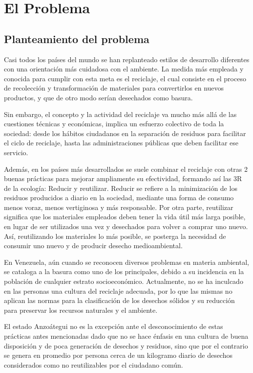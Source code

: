 \vspace*{6cm}
\chapter{El Problema}
\newpage

\section{Planteamiento del problema}

Casi todos los países del mundo se han replanteado estilos de desarrollo diferentes con una orientación más cuidadosa con el ambiente. La medida más empleada y conocida para cumplir con esta meta es el reciclaje, el cual consiste en el proceso de recolección y transformación de materiales para convertirlos en nuevos productos, y que de otro modo serían desechados como basura. 

Sin embargo, el concepto y la actividad del reciclaje va mucho más allá de las cuestiones técnicas y económicas, implica un esfuerzo colectivo de toda la sociedad: desde los hábitos ciudadanos en la separación de residuos para facilitar el ciclo de reciclaje, hasta las administraciones públicas que deben facilitar ese servicio. 

Además, en los países más desarrollados se suele combinar el reciclaje con otras 2 buenas prácticas para mejorar ampliamente su efectividad, formando así las 3R de la ecología: Reducir y reutilizar. Reducir se refiere a la minimización de los residuos producidos a diario en la sociedad, mediante una forma de consumo menos voraz, menos vertiginosa y más responsable. Por otra parte, reutilizar significa que los materiales empleados deben tener la vida útil más larga posible, en lugar de ser utilizados una vez y desechados para volver a comprar uno nuevo. Así, reutilizando los materiales lo más posible, se posterga la necesidad de consumir uno nuevo y de producir desecho medioambiental.

En Venezuela, aún cuando se reconocen diversos problemas en materia ambiental, se cataloga a la basura como uno de los principales, debido a su incidencia en la población de cualquier estrato socioeconómico. Actualmente, no se ha inculcado en las personas una cultura del reciclaje adecuada, por lo que las mismas no aplican las normas para la clasificación de los desechos sólidos y su reducción para preservar los recursos naturales y el ambiente.

El estado Anzoátegui no es la excepción ante el desconocimiento de estas prácticas antes mencionadas dado que no se hace énfasis en una cultura de buena disposición y de poca generación de desechos y residuos, sino que por el contrario se genera en promedio por persona cerca de un kilogramo diario de desechos considerados como no reutilizables por el ciudadano común.


